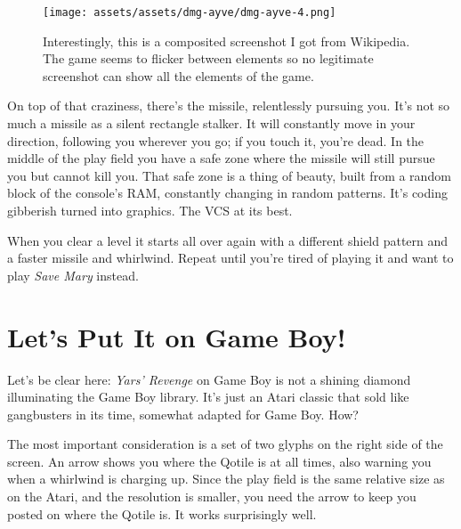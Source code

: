 \documentclass{book}
\let\oldcenter\center
\let\oldendcenter\endcenter
\renewenvironment{center}{\setlength\topsep{0pt}\oldcenter}{\oldendcenter}
\begin{document}
\begin{figure}[hbt]
\vskip 10pt
\centering \texttt{[image: assets/assets/dmg-ayve/dmg-ayve-4.png]}\par\pagetwodescription Interestingly, this is a composited screenshot I got from Wikipedia. The game seems to flicker between elements so no legitimate screenshot can show all the elements of the game.
\vskip 6pt
\end{figure}

On top of that craziness, there’s the missile, relentlessly pursuing you. It’s not so much a missile as a silent rectangle stalker. It will constantly move in your direction, following you wherever you go; if you touch it, you’re dead. In the middle of the play field you have a safe zone where the missile will still pursue you but cannot kill you. That safe zone is a thing of beauty, built from a random block of the console’s RAM, constantly changing in random patterns. It’s coding gibberish turned into graphics. The VCS at its best.

When you clear a level it starts all over again with a different shield pattern and a faster missile and whirlwind. Repeat until you’re tired of playing it and want to play \emph{Save Mary} instead.

\FloatBarrier\needspace{5pt}\section*{Let’s Put It on Game Boy!}\nopagebreak[4]

Let’s be clear here: \emph{Yars’ Revenge} on Game Boy is not a shining diamond illuminating the Game Boy library. It’s just an Atari classic that sold like gangbusters in its time, somewhat adapted for Game Boy. How?

\begin{center}
\vspace{8pt}
\quad\vspace{4pt}
\end{center}

The most important consideration is a set of two glyphs on the right side of the screen. An arrow shows you where the Qotile is at all times, also warning you when a whirlwind is charging up. Since the play field is the same relative size as on the Atari, and the resolution is smaller, you need the arrow to keep you posted on where the Qotile is. It works surprisingly well.
\end{document}
